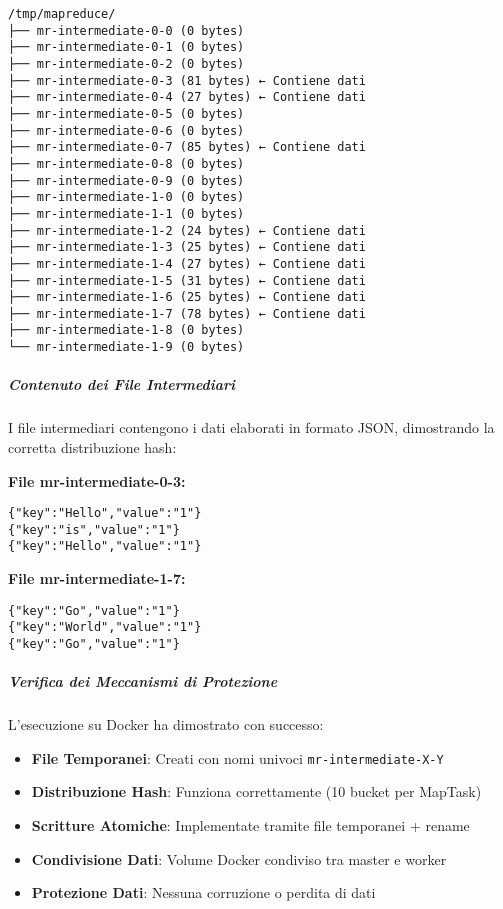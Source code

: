 \documentclass[12pt,a4paper]{article}
\begin{document}
\begin{verbatim}
/tmp/mapreduce/
├── mr-intermediate-0-0 (0 bytes)
├── mr-intermediate-0-1 (0 bytes)  
├── mr-intermediate-0-2 (0 bytes)
├── mr-intermediate-0-3 (81 bytes) ← Contiene dati
├── mr-intermediate-0-4 (27 bytes) ← Contiene dati
├── mr-intermediate-0-5 (0 bytes)
├── mr-intermediate-0-6 (0 bytes)
├── mr-intermediate-0-7 (85 bytes) ← Contiene dati
├── mr-intermediate-0-8 (0 bytes)
├── mr-intermediate-0-9 (0 bytes)
├── mr-intermediate-1-0 (0 bytes)
├── mr-intermediate-1-1 (0 bytes)
├── mr-intermediate-1-2 (24 bytes) ← Contiene dati
├── mr-intermediate-1-3 (25 bytes) ← Contiene dati
├── mr-intermediate-1-4 (27 bytes) ← Contiene dati
├── mr-intermediate-1-5 (31 bytes) ← Contiene dati
├── mr-intermediate-1-6 (25 bytes) ← Contiene dati
├── mr-intermediate-1-7 (78 bytes) ← Contiene dati
├── mr-intermediate-1-8 (0 bytes)
└── mr-intermediate-1-9 (0 bytes)
\end{verbatim}

\subparagraph{Contenuto dei File Intermediari}

I file intermediari contengono i dati elaborati in formato JSON, dimostrando la corretta distribuzione hash:

\textbf{File mr-intermediate-0-3:}
\begin{verbatim}
{"key":"Hello","value":"1"}
{"key":"is","value":"1"}
{"key":"Hello","value":"1"}
\end{verbatim}

\textbf{File mr-intermediate-1-7:}
\begin{verbatim}
{"key":"Go","value":"1"}
{"key":"World","value":"1"}
{"key":"Go","value":"1"}
\end{verbatim}

\subparagraph{Verifica dei Meccanismi di Protezione}

L'esecuzione su Docker ha dimostrato con successo:

\begin{itemize}
\item \textbf{File Temporanei}: Creati con nomi univoci \texttt{mr-intermediate-X-Y}
\item \textbf{Distribuzione Hash}: Funziona correttamente (10 bucket per MapTask)
\item \textbf{Scritture Atomiche}: Implementate tramite file temporanei + rename
\item \textbf{Condivisione Dati}: Volume Docker condiviso tra master e worker
\item \textbf{Protezione Dati}: Nessuna corruzione o perdita di dati
\end{itemize}
\end{document}
